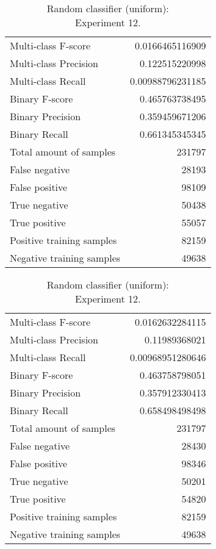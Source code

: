 \begin{table}[H]
\begin{minipage}{0.5\textwidth}
\caption{Random classifier (uniform): \\Experiment 11.}
\centering
\begin{tabular}{l r}
\toprule
Multi-class F-score & 0.0166465116909 \\
Multi-class Precision & 0.122515220998 \\
Multi-class Recall & 0.00988796231185 \\
\midrule
Binary F-score & 0.465763738495 \\
Binary Precision & 0.359459671206 \\
Binary Recall & 0.661345345345 \\
\midrule
Total amount of samples & 231797 \\
False negative & 28193 \\
False positive & 98109 \\
True negative & 50438 \\
True positive & 55057 \\
\midrule
Positive training samples & 82159 \\
Negative training samples & 49638 \\
\bottomrule
\end{tabular}
\end{minipage}
\hfillx
\begin{minipage}{0.5\textwidth}
\caption{Random classifier (uniform): \\Experiment 12.}
\centering
\begin{tabular}{l r}
\toprule
Multi-class F-score & 0.0162632284115 \\
Multi-class Precision & 0.11989368021 \\
Multi-class Recall & 0.00968951280646 \\
\midrule
Binary F-score & 0.463758798051 \\
Binary Precision & 0.357912330413 \\
Binary Recall & 0.658498498498 \\
\midrule
Total amount of samples & 231797 \\
False negative & 28430 \\
False positive & 98346 \\
True negative & 50201 \\
True positive & 54820 \\
\midrule
Positive training samples & 82159 \\
Negative training samples & 49638 \\
\bottomrule
\end{tabular}
\end{minipage}
\end{table}

